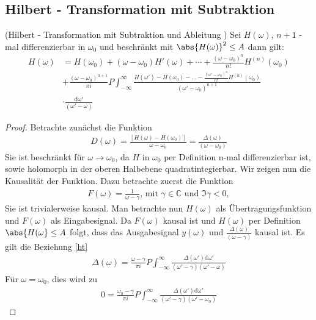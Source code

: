 \subsection{Hilbert - Transformation mit Subtraktion}\label{skkt}
\begin{satz}(Hilbert - Transformation mit Subtraktion und Ableitung   )
Sei $H(\omega)$, $n + 1$ - mal differenzierbar in $\omega_0$ und beschränkt mit $\abs{H(\omega)}^2 \leq A$ dann gilt:
\begin{align}
	H(\omega) &= H(\omega_0) + (\omega - \omega_0) H'(\omega) + \cdots + \frac{(\omega - \omega_0)^n}{n!} H^{(n)}(\omega_0)\\
	&+ \frac{(\omega - \omega_0)^{n+1}}{\pi i} P \int^{\infty}_{-\infty} \frac{H(\omega') - H(\omega_0) - \hdots - \frac{(\omega' - \omega_0)^n}{n!} H^{(n)}(\omega_0)}{(\omega' - \omega_0)^{n+1}} \\
	&\cdot \frac{\mathrm{d\omega'}}{(\omega' - \omega)} \label{skkt:diff}
\end{align}
\begin{proof}
Betrachte zunächst die Funktion 
\begin{align}
	D(\omega) = \frac{\left[H(\omega) - H(\omega_0)\right]}{\omega - \omega_0}  = \frac{\Delta(\omega)}{(\omega - \omega_0)} 
\end{align}
	Sie ist beschränkt für $\omega \rightarrow \omega_0$, da $H$ in $\omega_0$ per Definition n-mal differenzierbar ist, sowie holomorph in der oberen Halbebene quadratintegierbar. Wir zeigen nun die Kausalität der Funktion. Dazu betrachte zuerst die Funktion
	\begin{align}
	 	F(\omega) = \frac{1}{\omega - \gamma} \text{, mit } \gamma \in \mathbb{C} \text{ und } \Im{\gamma} < 0,
	\end{align}
	Sie ist trivialerweise kausal. Man betrachte nun $H(\omega)$ als Übertragungsfunktion und $F(\omega)$ als Eingabesignal. Da $F(\omega)$ kausal ist und $H(\omega)$ per Definition $\abs{H(\omega} \leq A$ folgt, dass das Ausgabesignal $y(\omega)$ und $\frac{\Delta(\omega)}{(\omega - \gamma)}$ kausal ist. Es gilt die Beziehung \ref{ht}
	\begin{align}
		\Delta(\omega) = \frac{\omega - \gamma}{\pi i} P \int_{-\infty}^{\infty} \frac{\Delta(\omega')\mathrm{d\omega'}}{(\omega'-\gamma)(\omega'-\omega)}\label{skkt:gl1}
	\end{align}
	Für $\omega  = \omega_0$, dies wird zu 
	\begin{align}
		0 = \frac{\omega_0 - \gamma}{\pi i} P \int_{-\infty}^{\infty} \frac{\Delta(\omega')\mathrm{d\omega'}}{(\omega'-\gamma)(\omega'-\omega_0)}\label{skkt:gl2}

\end{align}
\end{proof}
\end{satz}
